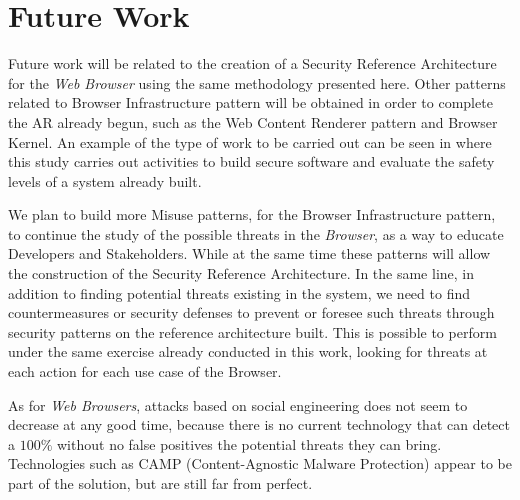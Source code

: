 \documentclass{sig-alternate-05-2015}
\begin{document}
\section*{Future Work}
Future work will be related to the creation of a Security Reference Architecture for the \textit{Web Browser} using the same methodology presented here. Other patterns related to Browser Infrastructure pattern will be obtained in order to complete the AR already begun, such as the Web Content Renderer pattern and Browser Kernel. An example of the type of work to be carried out can be seen in \cite{fernandez2014security} where this study carries out activities to build secure software and evaluate the safety levels of a system already built.

We plan to build more Misuse patterns, for the Browser Infrastructure pattern, to continue the study of the possible threats in the \textit{Browser}, as a way to educate Developers and Stakeholders. While at the same time these patterns will allow the construction of the Security Reference Architecture. In the same line, in addition to finding potential threats existing in the system, we need to find countermeasures or security defenses to prevent or foresee such threats through security patterns on the reference architecture built. This is possible to perform under the same exercise already conducted in this work, looking for threats at each action for each use case of the Browser.

As for \textit{Web Browsers}, attacks based on social engineering does not seem to decrease at any good time, because there is no current technology that can detect a \(100 \% \) without no false positives the potential threats they can bring. Technologies such as CAMP (Content-Agnostic Malware Protection) appear to be part of the solution, but are still far from perfect.


  

\end{document}
